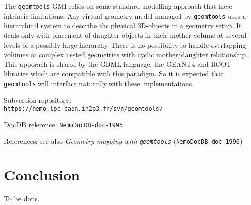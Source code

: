 \documentclass[a4paper,12pt]{article}
\newcommand{\pn}{\par\noindent}
\begin{document}
\pn  The  \texttt{geomtools} GMI  relies  on  some standard  modelling
approach that  have intrinsic limitations. Any  virtual geometry model
managed by  \texttt{geomtools} uses a hierarchical  system to describe
the  physical 3D-objects  in a  geometry  setup.  It  deals only  with
placement of daughter objects in their mother volume at several levels
of  a possibly  large hierarchy.  There  is no  possibility to  handle
overlapping   volumes  or  complex   nested  geometries   with  cyclic
mother/daughter  relationship. This  apporach  is shared  by the  GDML
language, the GEANT4 and ROOT libraries which are compatible with this
paradigm.  So  it is  expected that \texttt{geomtools}  will interface
naturally with these implementations.

\vskip 5mm
\pn
Subversion repository:\\
\texttt{https://nemo.lpc-caen.in2p3.fr/svn/geomtools/}
\pn
DocDB reference: \texttt{NemoDocDB-doc-1995}
\pn
References: see also
\textit{Geometry mapping with \texttt{geomtools}} (\texttt{NemoDocDB-doc-1996})
\pagebreak



\clearpage


\clearpage

\section{Conclusion}

\pn To be done.
\end{document}
